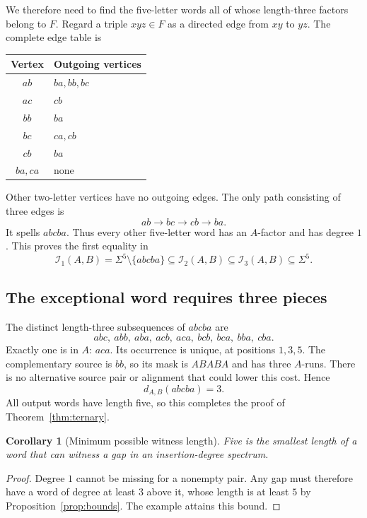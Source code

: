 \documentclass[11pt,letterpaper]{article}
\newtheorem{corollary}[theorem]{Corollary}
\theoremstyle{definition}\newtheorem{definition}[theorem]{Definition}
\theoremstyle{remark}\newtheorem{remark}[theorem]{Remark}
\theoremstyle{definition}\newtheorem{question}[theorem]{Question}
\newcommand{\ins}[3]{\mathcal I_{#1}(#2,#3)}
\begin{document}
We therefore need to find the five-letter words all of whose length-three factors belong to $F$. Regard a triple $xyz\in F$ as a directed edge from $xy$ to $yz$. The complete edge table is
\begin{center}
\begin{tabular}{cl}
\toprule
Vertex & Outgoing vertices\\
\midrule
$ab$ & $ba,bb,bc$\\
$ac$ & $cb$\\
$bb$ & $ba$\\
$bc$ & $ca,cb$\\
$cb$ & $ba$\\
$ba,ca$ & none\\
\bottomrule
\end{tabular}
\end{center}
Other two-letter vertices have no outgoing edges. The only path consisting of three edges is
\[
 ab\longrightarrow bc\longrightarrow cb\longrightarrow ba.
\]
It spells $abcba$. Thus every other five-letter word has an $A$-factor and has degree $1$. This proves the first equality in
\[
 \ins{1}{A}{B}=\Sigma^5\setminus\{abcba\}
 \subseteq\ins{2}{A}{B}\subseteq\ins{3}{A}{B}\subseteq\Sigma^5.
\]

\subsection{The exceptional word requires three pieces}

The distinct length-three subsequences of $abcba$ are
\[
 abc,\ abb,\ aba,\ acb,\ aca,\ bcb,\ bca,\ bba,\ cba.
\]
Exactly one is in $A$: $aca$. Its occurrence is unique, at positions $1,3,5$. The complementary source is $bb$, so its mask is $ABABA$ and has three $A$-runs. There is no alternative source pair or alignment that could lower this cost. Hence
\[
 d_{A,B}(abcba)=3.
\]
All output words have length five, so this completes the proof of Theorem~\ref{thm:ternary}.

\begin{corollary}[Minimum possible witness length]
Five is the smallest length of a word that can witness a gap in an insertion-degree spectrum.
\end{corollary}
\begin{proof}
Degree $1$ cannot be missing for a nonempty pair. Any gap must therefore have a word of degree at least $3$ above it, whose length is at least $5$ by Proposition~\ref{prop:bounds}. The example attains this bound.
\end{proof}
\end{document}

